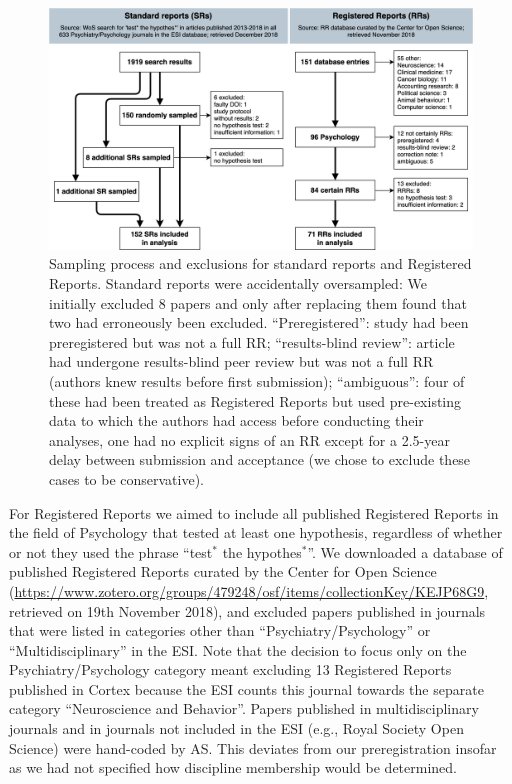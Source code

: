 \documentclass[british,,jou,floatsintext]{apa6}
\begin{document}
\begin{figure}
\includegraphics[width=\textwidth]{sampling_process_flowchart} \caption{Sampling process and exclusions for standard reports and Registered Reports. Standard reports were accidentally oversampled: We initially excluded 8 papers and only after replacing them found that two had erroneously been excluded. \enquote{Preregistered}: study had been preregistered but was not a full RR; \enquote{results-blind review}: article had undergone results-blind peer review but was not a full RR (authors knew results before first submission); \enquote{ambiguous}: four of these had been treated as Registered Reports but used pre-existing data to which the authors had access before conducting their analyses, one had no explicit signs of an RR except for a 2.5-year delay between submission and acceptance (we chose to exclude these cases to be conservative).}\label{fig:sampling}
\end{figure}

For Registered Reports we aimed to include all published Registered Reports in the field of Psychology that tested at least one hypothesis, regardless of whether or not they used the phrase \enquote{test\(^\ast\) the hypothes\(^\ast\)}.
We downloaded a database of published Registered Reports curated by the Center for Open Science (\url{https://www.zotero.org/groups/479248/osf/items/collectionKey/KEJP68G9}, retrieved on 19th November 2018), and excluded papers published in journals that were listed in categories other than \enquote{Psychiatry/Psychology} or \enquote{Multidisciplinary} in the ESI.
Note that the decision to focus only on the Psychiatry/Psychology category meant excluding 13 Registered Reports published in Cortex because the ESI counts this journal towards the separate category \enquote{Neuroscience and Behavior}.
Papers published in multidisciplinary journals and in journals not included in the ESI (e.g., Royal Society Open Science) were hand-coded by AS.
This deviates from our preregistration insofar as we had not specified how discipline membership would be determined.
\end{document}

